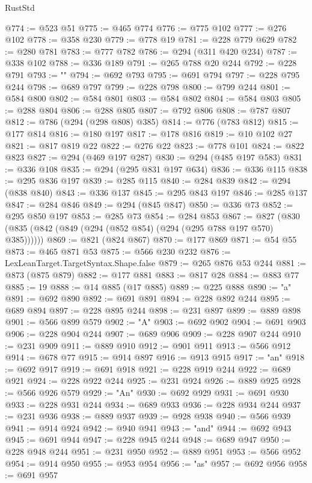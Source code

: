 \begin{lexlean}{RustStd}
\begin{coremodule}
@774 := @523 @51
@775 := @465 @774
@776 := @775 @102
@777 := @276 @102
@778 := @358 @230
@779 := @778 @19
@781 := @228 @779 @629
@782 := @280 @781
@783 := @777 @782
@786 := @294 (@311 @420 @234)
@787 := @338 @102
@788 := @336 @189
@791 := @265 @788 @20 @244
@792 := @228 @791
@793 := ""
@794 := @692 @793
@795 := @691 @794
@797 := @228 @795 @244
@798 := @689 @797
@799 := @228 @798
@800 := @799 @244
@801 := @584 @800
@802 := @584 @801
@803 := @584 @802
@804 := @584 @803
@805 := @288 @804
@806 := @288 @805
@807 := @792 @806
@808 := @787 @807
@812 := @786 (@294 (@298 @808) @385)
@814 := @776 (@783 @812)
@815 := @177 @814
@816 := @180 @197
@817 := @178 @816
@819 := @10 @102 @27
@821 := @817 @819 @22
@822 := @276 @22
@823 := @778 @101
@824 := @822 @823
@827 := @294 (@469 @197 @287)
@830 := @294 (@485 @197 @583)
@831 := @336 @108
@835 := @294 (@295 @831 @197 @634)
@836 := @336 @115
@838 := @295 @836 @197
@839 := @285 @115
@840 := @284 @839
@842 := @294 (@838 @840)
@843 := @336 @137
@845 := @295 @843 @197
@846 := @285 @137
@847 := @284 @846
@849 := @294 (@845 @847)
@850 := @336 @73
@852 := @295 @850 @197
@853 := @285 @73
@854 := @284 @853
@867 := @827 (@830 (@835 (@842 (@849 (@294 (@852 @854) (@294 (@295 @788 @197 @570) @385))))))
@869 := @821 (@824 @867)
@870 := @177 @869
@871 := @54 @55
@873 := @465 @871 @53
@875 := @566 @230 @232
@876 := LexLeanTarget.TargetSyntax.Shape.false
@879 := @265 @876 @53 @244
@881 := @873 (@875 @879)
@882 := @177 @881
@883 := @817 @28
@884 := @883 @77
@885 := 19
@888 := @14 @885 (@17 @885)
@889 := @225 @888
@890 := "a"
@891 := @692 @890
@892 := @691 @891
@894 := @228 @892 @244
@895 := @689 @894
@897 := @228 @895 @244
@898 := @231 @897
@899 := @889 @898
@901 := @566 @899 @579
@902 := "A"
@903 := @692 @902
@904 := @691 @903
@906 := @228 @904 @244
@907 := @689 @906
@909 := @228 @907 @244
@910 := @231 @909
@911 := @889 @910
@912 := @901 @911
@913 := @566 @912
@914 := @678 @77
@915 := @914 @897
@916 := @913 @915
@917 := "an"
@918 := @692 @917
@919 := @691 @918
@921 := @228 @919 @244
@922 := @689 @921
@924 := @228 @922 @244
@925 := @231 @924
@926 := @889 @925
@928 := @566 @926 @579
@929 := "An"
@930 := @692 @929
@931 := @691 @930
@933 := @228 @931 @244
@934 := @689 @933
@936 := @228 @934 @244
@937 := @231 @936
@938 := @889 @937
@939 := @928 @938
@940 := @566 @939
@941 := @914 @924
@942 := @940 @941
@943 := "and"
@944 := @692 @943
@945 := @691 @944
@947 := @228 @945 @244
@948 := @689 @947
@950 := @228 @948 @244
@951 := @231 @950
@952 := @889 @951
@953 := @566 @952
@954 := @914 @950
@955 := @953 @954
@956 := "as"
@957 := @692 @956
@958 := @691 @957

\end{coremodule}
\end{lexlean}
